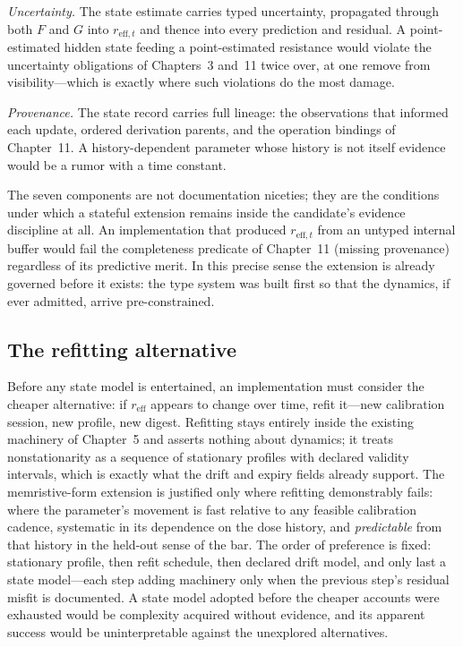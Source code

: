 \emph{Uncertainty.} The state estimate carries typed uncertainty, propagated through both $F$ and $G$ into $r_{\mathrm{eff},t}$ and thence into every prediction and residual. A point-estimated hidden state feeding a point-estimated resistance would violate the uncertainty obligations of Chapters~3 and~11 twice over, at one remove from visibility---which is exactly where such violations do the most damage.

\emph{Provenance.} The state record carries full lineage: the observations that informed each update, ordered derivation parents, and the operation bindings of Chapter~11. A history-dependent parameter whose history is not itself evidence would be a rumor with a time constant.

\begin{remark}\label{mem:rem:price}
The seven components are not documentation niceties; they are the conditions under which a stateful extension remains inside the candidate's evidence discipline at all. An implementation that produced $r_{\mathrm{eff},t}$ from an untyped internal buffer would fail the completeness predicate of Chapter~11 (missing provenance) regardless of its predictive merit. In this precise sense the extension is already governed before it exists: the type system was built first so that the dynamics, if ever admitted, arrive pre-constrained.
\end{remark}

\subsection{The refitting alternative}\label{mem:sec:refitting}

Before any state model is entertained, an implementation must consider the cheaper alternative: if $r_{\mathrm{eff}}$ appears to change over time, refit it---new calibration session, new profile, new digest. Refitting stays entirely inside the existing machinery of Chapter~5 and asserts nothing about dynamics; it treats nonstationarity as a sequence of stationary profiles with declared validity intervals, which is exactly what the drift and expiry fields already support. The memristive-form extension is justified only where refitting demonstrably fails: where the parameter's movement is fast relative to any feasible calibration cadence, systematic in its dependence on the dose history, and \emph{predictable} from that history in the held-out sense of the bar. The order of preference is fixed: stationary profile, then refit schedule, then declared drift model, and only last a state model---each step adding machinery only when the previous step's residual misfit is documented. A state model adopted before the cheaper accounts were exhausted would be complexity acquired without evidence, and its apparent success would be uninterpretable against the unexplored alternatives.

